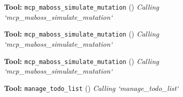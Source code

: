 \documentclass[11pt,a4paper]{article}
\begin{document}
\begin{toolokbox}
\textbf{Tool:} \texttt{mcp\_maboss\_simulate\_mutation} (\checkmark)
\textit{Calling `mcp\_maboss\_simulate\_mutation`}
\end{toolokbox}
\begin{toolokbox}
\textbf{Tool:} \texttt{mcp\_maboss\_simulate\_mutation} (\checkmark)
\textit{Calling `mcp\_maboss\_simulate\_mutation`}
\end{toolokbox}
\begin{toolokbox}
\textbf{Tool:} \texttt{mcp\_maboss\_simulate\_mutation} (\checkmark)
\textit{Calling `mcp\_maboss\_simulate\_mutation`}
\end{toolokbox}
\begin{toolokbox}
\textbf{Tool:} \texttt{manage\_todo\_list} (\checkmark)
\textit{Calling `manage\_todo\_list`}
\end{toolokbox}
\end{document}

